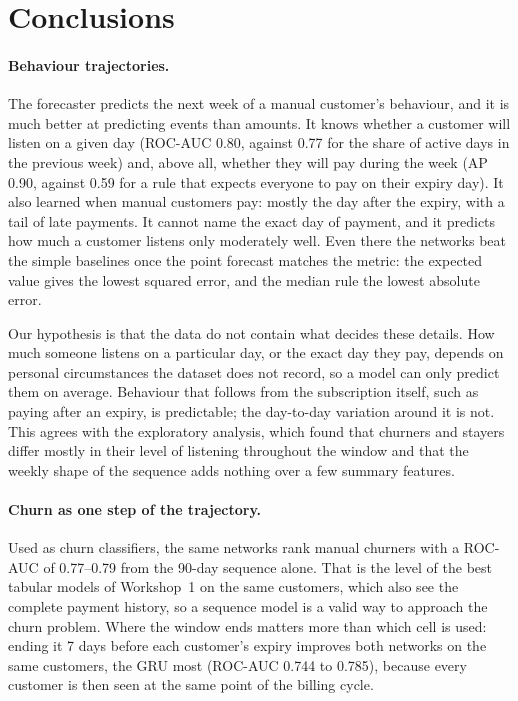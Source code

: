\documentclass{article}
\begin{document}
\section{Conclusions}

\paragraph{Behaviour trajectories.} The forecaster predicts the next week of a manual customer's behaviour, and it is much better at predicting events than amounts. It knows whether a customer will listen on a given day (ROC-AUC 0.80, against 0.77 for the share of active days in the previous week) and, above all, whether they will pay during the week (AP 0.90, against 0.59 for a rule that expects everyone to pay on their expiry day). It also learned when manual customers pay: mostly the day after the expiry, with a tail of late payments. It cannot name the exact day of payment, and it predicts how much a customer listens only moderately well. Even there the networks beat the simple baselines once the point forecast matches the metric: the expected value gives the lowest squared error, and the median rule the lowest absolute error.

Our hypothesis is that the data do not contain what decides these details. How much someone listens on a particular day, or the exact day they pay, depends on personal circumstances the dataset does not record, so a model can only predict them on average. Behaviour that follows from the subscription itself, such as paying after an expiry, is predictable; the day-to-day variation around it is not. This agrees with the exploratory analysis, which found that churners and stayers differ mostly in their level of listening throughout the window and that the weekly shape of the sequence adds nothing over a few summary features.

\paragraph{Churn as one step of the trajectory.} Used as churn classifiers, the same networks rank manual churners with a ROC-AUC of 0.77--0.79 from the 90-day sequence alone. That is the level of the best tabular models of Workshop~1 on the same customers, which also see the complete payment history, so a sequence model is a valid way to approach the churn problem. Where the window ends matters more than which cell is used: ending it 7 days before each customer's expiry improves both networks on the same customers, the GRU most (ROC-AUC 0.744 to 0.785), because every customer is then seen at the same point of the billing cycle.
\end{document}
